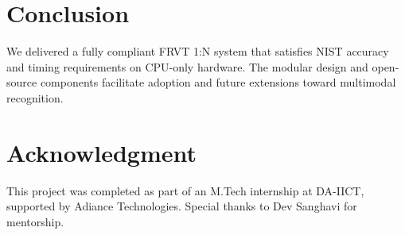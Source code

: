 \documentclass[conference]{IEEEtran}
\begin{document}
\section{Conclusion}
We delivered a fully compliant FRVT 1:N system that satisfies NIST accuracy and timing requirements on CPU-only hardware. The modular design and open-source components facilitate adoption and future extensions toward multimodal recognition.

\section*{Acknowledgment}
This project was completed as part of an M.Tech internship at DA-IICT, supported by Adiance Technologies. Special thanks to Dev Sanghavi for mentorship.



\end{document}
